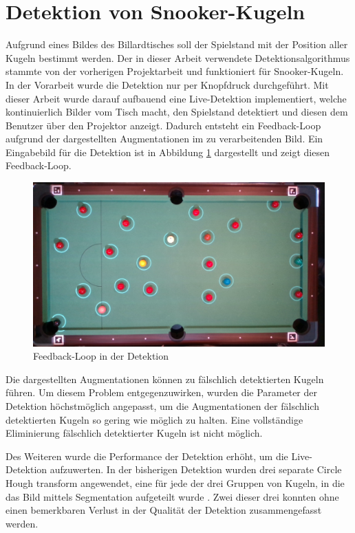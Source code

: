 \newpage
\section{Detektion von Snooker-Kugeln}\label{kap:detektion}
Aufgrund eines Bildes des Billardtisches soll der Spielstand mit der Position aller Kugeln bestimmt werden.
Der in dieser Arbeit verwendete Detektionsalgorithmus stammte von der vorherigen Projektarbeit \cite{project2:snooker_detection}
und funktioniert für Snooker-Kugeln.
In der Vorarbeit wurde die Detektion nur per Knopfdruck durchgeführt.
Mit dieser Arbeit wurde darauf aufbauend eine Live-Detektion implementiert, welche kontinuierlich Bilder vom Tisch macht,
den Spielstand detektiert und diesen dem Benutzer über den Projektor anzeigt.
Dadurch entsteht ein Feedback-Loop aufgrund der dargestellten Augmentationen im zu verarbeitenden Bild.
Ein Eingabebild für die Detektion ist in Abbildung \ref{fig:detection_feedback_loop} dargestellt und zeigt diesen Feedback-Loop.

\begin{figure}[h!]
    \begin{center}
        \includegraphics[width=0.8\linewidth]{../common/03_billiard_ai/resources/detection_feedback_loop.png}
    \end{center}
    \caption{Feedback-Loop in der Detektion}
    \label{fig:detection_feedback_loop}
\end{figure}

Die dargestellten Augmentationen können zu fälschlich detektierten Kugeln führen.
Um diesem Problem entgegenzuwirken, wurden die Parameter der Detektion höchstmöglich angepasst, um die Augmentationen
der fälschlich detektierten Kugeln so gering wie möglich zu halten.
Eine vollständige Eliminierung fälschlich detektierter Kugeln ist nicht möglich.

Des Weiteren wurde die Performance der Detektion erhöht, um die Live-Detektion aufzuwerten.
In der bisherigen Detektion wurden drei separate Circle Hough transform \cite{wiki:circle_hough} angewendet, eine für
jede der drei Gruppen von Kugeln, in die das Bild mittels Segmentation aufgeteilt wurde \cite{project2:snooker_detection}.
Zwei dieser drei konnten ohne einen bemerkbaren Verlust in der Qualität der Detektion zusammengefasst werden.

